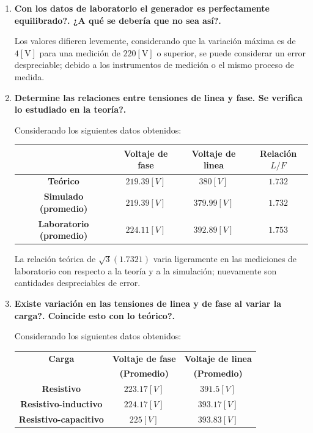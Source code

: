 \documentclass[letter,11pt]{article}
\begin{document}
\begin{enumerate}

\item \textbf{Con los datos de laboratorio el generador es perfectamente
equilibrado?. ¿A qué se debería que no sea así?.}

Los valores difieren levemente, considerando que la variación máxima es de
$4[\text{V}]$ para una medición de $220[\text{V}]$ o superior, se puede
considerar un error despreciable; debido a los instrumentos de medición o el
mismo proceso de medida.

\item \textbf{Determine las relaciones entre tensiones de linea y fase. Se
verifica lo estudiado en la teoría?.}

Considerando los siguientes datos obtenidos:
\begin{center}
    \begin{tabular}{|c||c|c||c|}
    \hline
    & \textbf{Voltaje de fase} & \textbf{Voltaje de linea} & \textbf{Relación $L/F$}
    \tabularnewline \hline \hline
    \textbf{Teórico} & $219.39[V]$ & $380[V]$ & $1.732$
    \tabularnewline \hline
    \textbf{Simulado (promedio)} & $219.39[V]$ & $379.99[V]$ & $1.732$
    \tabularnewline \hline
    \textbf{Laboratorio (promedio)} & $224.11[V]$ & $392.89[V]$ & $1.753$
    \tabularnewline \hline
    \end{tabular}
\end{center}

La relación teórica de $\sqrt{3} (1.7321)$ varia ligeramente en las mediciones
de laboratorio con respecto a la teoría y a la simulación; nuevamente son
cantidades despreciables de error.

\item \textbf{Existe variación en las tensiones de linea y de fase al variar la
carga?. Coincide esto con lo teórico?.}

Considerando los siguientes datos obtenidos:
\begin{center}
    \begin{tabular}{|c||c|c|}
    \hline
    \textbf{Carga} & \textbf{Voltaje de fase} & \textbf{Voltaje de linea}
    \tabularnewline
    & \textbf{(Promedio)} & \textbf{(Promedio)}
    \tabularnewline \hline \hline
    \textbf{Resistivo} & $223.17[V]$ & $391.5[V]$
    \tabularnewline \hline
    \textbf{Resistivo-inductivo} & $224.17[V]$ & $393.17[V]$
    \tabularnewline \hline
    \textbf{Resistivo-capacitivo} & $225[V]$ & $393.83[V]$
    \tabularnewline \hline
    \end{tabular}
\end{center}


\end{enumerate}
\end{document}
